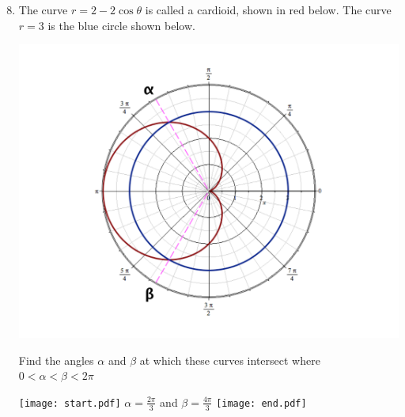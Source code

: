 \documentclass[12pt]{article}
\begin{document}
\begin{enumerate}
\setcounter{enumi}{7}


\item The curve $r=2-2\cos\theta$ is called a cardioid, shown in red below.  The curve $r=3$ is the blue circle shown below.
\begin{center}
\includegraphics[scale=0.3]{cardioid.pdf}
\end{center}

Find the angles $\alpha$ and $\beta$ at which these curves intersect where $0<\alpha<\beta< 2\pi$

\texttt{[image: start.pdf]}
{$\alpha=\frac{2\pi}{3}$ and $\beta=\frac{4\pi}{3}$}
\texttt{[image: end.pdf]}



\end{enumerate}
\end{document}
